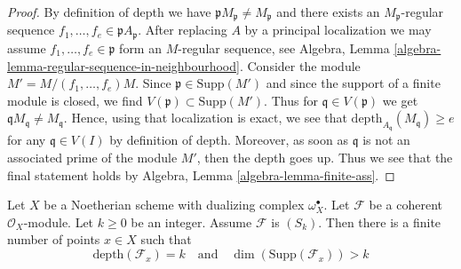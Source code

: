 \begin{proof}
By definition of depth we have $\mathfrak p M_\mathfrak p \not = M_\mathfrak p$
and there exists an $M_\mathfrak p$-regular sequence
$f_1, \ldots, f_e \in \mathfrak p A_\mathfrak p$. After replacing $A$ by
a principal localization we may assume $f_1, \ldots, f_e \in \mathfrak p$
form an $M$-regular sequence, see
Algebra, Lemma \ref{algebra-lemma-regular-sequence-in-neighbourhood}.
Consider the module $M' = M/(f_1, \ldots, f_e)M$.
Since $\mathfrak p \in \text{Supp}(M')$
and since the support of a finite module is closed, we find
$V(\mathfrak p) \subset \text{Supp}(M')$. Thus
for $\mathfrak q \in V(\mathfrak p)$ we get
$\mathfrak q M_\mathfrak q \not = M_\mathfrak q$. Hence, using that
localization is exact, we see that
$\text{depth}_{A_\mathfrak q}(M_\mathfrak q) \geq e$
for any $\mathfrak q \in V(I)$ by definition of depth.
Moreover, as soon as $\mathfrak q$ is not an associated
prime of the module $M'$, then the depth goes up.
Thus we see that the final statement holds by
Algebra, Lemma \ref{algebra-lemma-finite-ass}.
\end{proof}

\begin{lemma}
\label{lemma-finite-nr-points-next-S}
Let $X$ be a Noetherian scheme with dualizing complex $\omega_X^\bullet$.
Let $\mathcal{F}$ be a coherent $\mathcal{O}_X$-module. Let $k \geq 0$
be an integer. Assume $\mathcal{F}$ is $(S_k)$.
Then there is a finite number of points $x \in X$ such that
$$
\text{depth}(\mathcal{F}_x) = k
\quad\text{and}\quad
\dim(\text{Supp}(\mathcal{F}_x)) > k
$$
\end{lemma}

